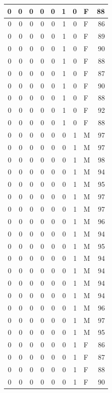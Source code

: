 \documentclass[
  12pt,
]{krantz}
\begin{document}
\begin{tabular}{r|r|r|r|r|r|r|l|r}
\hline
0 & 0 & 0 & 0 & 0 & 1 & 0 & F & 88\\
\hline
0 & 0 & 0 & 0 & 0 & 1 & 0 & F & 86\\
\hline
0 & 0 & 0 & 0 & 0 & 1 & 0 & F & 89\\
\hline
0 & 0 & 0 & 0 & 0 & 1 & 0 & F & 90\\
\hline
0 & 0 & 0 & 0 & 0 & 1 & 0 & F & 88\\
\hline
0 & 0 & 0 & 0 & 0 & 1 & 0 & F & 87\\
\hline
0 & 0 & 0 & 0 & 0 & 1 & 0 & F & 90\\
\hline
0 & 0 & 0 & 0 & 0 & 1 & 0 & F & 88\\
\hline
0 & 0 & 0 & 0 & 0 & 1 & 0 & F & 92\\
\hline
0 & 0 & 0 & 0 & 0 & 1 & 0 & F & 88\\
\hline
0 & 0 & 0 & 0 & 0 & 0 & 1 & M & 97\\
\hline
0 & 0 & 0 & 0 & 0 & 0 & 1 & M & 97\\
\hline
0 & 0 & 0 & 0 & 0 & 0 & 1 & M & 98\\
\hline
0 & 0 & 0 & 0 & 0 & 0 & 1 & M & 94\\
\hline
0 & 0 & 0 & 0 & 0 & 0 & 1 & M & 95\\
\hline
0 & 0 & 0 & 0 & 0 & 0 & 1 & M & 97\\
\hline
0 & 0 & 0 & 0 & 0 & 0 & 1 & M & 97\\
\hline
0 & 0 & 0 & 0 & 0 & 0 & 1 & M & 96\\
\hline
0 & 0 & 0 & 0 & 0 & 0 & 1 & M & 94\\
\hline
0 & 0 & 0 & 0 & 0 & 0 & 1 & M & 95\\
\hline
0 & 0 & 0 & 0 & 0 & 0 & 1 & M & 94\\
\hline
0 & 0 & 0 & 0 & 0 & 0 & 1 & M & 94\\
\hline
0 & 0 & 0 & 0 & 0 & 0 & 1 & M & 94\\
\hline
0 & 0 & 0 & 0 & 0 & 0 & 1 & M & 94\\
\hline
0 & 0 & 0 & 0 & 0 & 0 & 1 & M & 96\\
\hline
0 & 0 & 0 & 0 & 0 & 0 & 1 & M & 97\\
\hline
0 & 0 & 0 & 0 & 0 & 0 & 1 & M & 95\\
\hline
0 & 0 & 0 & 0 & 0 & 0 & 1 & F & 86\\
\hline
0 & 0 & 0 & 0 & 0 & 0 & 1 & F & 87\\
\hline
0 & 0 & 0 & 0 & 0 & 0 & 1 & F & 88\\
\hline
0 & 0 & 0 & 0 & 0 & 0 & 1 & F & 90\\

\end{tabular}
\end{document}

